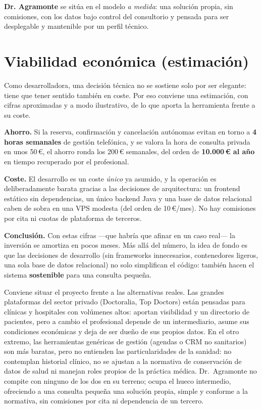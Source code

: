 \documentclass[12pt,a4paper]{report}
\begin{document}
\textbf{Dr. Agramonte} se sitúa en el modelo \emph{a medida}: una solución propia, sin comisiones, con los datos bajo control del consultorio y pensada para ser desplegable y mantenible por un perfil técnico.

\section{Viabilidad económica (estimación)}

Como desarrolladora, una decisión técnica no se sostiene solo por ser elegante: tiene que tener sentido también en coste. Por eso conviene una estimación, con cifras aproximadas y a modo ilustrativo, de lo que aporta la herramienta frente a su coste.

\textbf{Ahorro.} Si la reserva, confirmación y cancelación autónomas evitan en torno a \textbf{4 horas semanales} de gestión telefónica, y se valora la hora de consulta privada en unos 50\,€, el ahorro ronda los 200\,€ semanales, del orden de \textbf{10.000\,€ al año} en tiempo recuperado por el profesional.

\textbf{Coste.} El desarrollo es un coste \emph{único} ya asumido, y la operación es deliberadamente barata gracias a las decisiones de arquitectura: un frontend estático sin dependencias, un único backend Java y una base de datos relacional caben de sobra en una VPS modesta (del orden de 10\,€/mes). No hay comisiones por cita ni cuotas de plataforma de terceros.

\textbf{Conclusión.} Con estas cifras —que habría que afinar en un caso real— la inversión se amortiza en pocos meses. Más allá del número, la idea de fondo es que las decisiones de desarrollo (sin frameworks innecesarios, contenedores ligeros, una sola base de datos relacional) no solo simplifican el código: también hacen el sistema \textbf{sostenible} para una consulta pequeña.

Conviene situar el proyecto frente a las alternativas reales. Las grandes plataformas del sector privado (Doctoralia, Top Doctors) están pensadas para clínicas y hospitales con volúmenes altos: aportan visibilidad y un directorio de pacientes, pero a cambio el profesional depende de un intermediario, asume sus condiciones económicas y deja de ser dueño de sus propios datos. En el otro extremo, las herramientas genéricas de gestión (agendas o CRM no sanitarios) son más baratas, pero no entienden las particularidades de la sanidad: no contemplan historial clínico, no se ajustan a la normativa de conservación de datos de salud ni manejan roles propios de la práctica médica. Dr.\ Agramonte no compite con ninguno de los dos en su terreno; ocupa el hueco intermedio, ofreciendo a una consulta pequeña una solución propia, simple y conforme a la normativa, sin comisiones por cita ni dependencia de un tercero.
\end{document}

